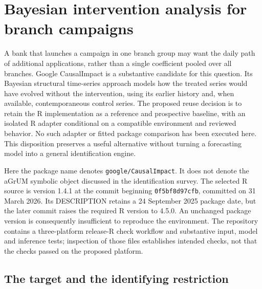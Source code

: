 \section{Bayesian intervention analysis for branch campaigns}
\label{exec13:causalimpact-reuse}

A bank that launches a campaign in one branch group may want the daily path of
additional applications, rather than a single coefficient pooled over all
branches. Google CausalImpact is a substantive candidate for this question.
Its Bayesian structural time-series approach models how the treated series
would have evolved without the intervention, using its earlier history and,
when available, contemporaneous control series. The proposed reuse decision
is to retain the R implementation as a reference and prospective baseline,
with an isolated R adapter conditional on a compatible environment and
reviewed behavior. No such adapter or fitted package comparison has been
executed here. This disposition preserves a useful alternative without
turning a forecasting model into a general identification engine.
\citep{exec13_ci_reuse,exec13_ci_r}

Here the package name denotes \texttt{google/CausalImpact}. It does not denote
the aGrUM symbolic object discussed in the identification survey. The
selected R source is version 1.4.1 at the commit beginning
\texttt{0f5bf8d97cfb}, committed on 31 March 2026. Its DESCRIPTION retains a
24 September 2025 package date, but the later commit raises the required R
version to 4.5.0. An unchanged package version is consequently insufficient
to reproduce the environment. The repository contains a three-platform
release-R check workflow and substantive input, model and inference tests;
inspection of those files establishes intended checks, not that the checks
passed on the proposed platform. \citep{exec13_ci_r,exec13_ci_semantics}

\subsection{The target and the identifying restriction}

